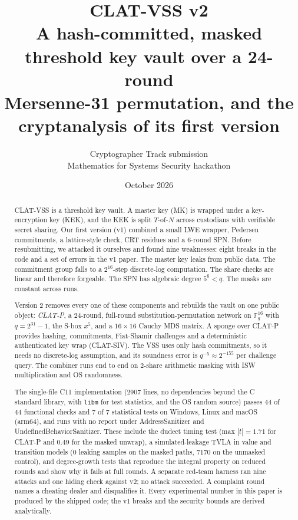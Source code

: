 \documentclass[10pt,a4paper]{article}
\title{\textbf{CLAT-VSS v2}\\[4pt]
\large A hash-committed, masked threshold key vault over a 24-round\\ Mersenne-31 permutation, and the cryptanalysis of its first version}
\author{Cryptographer Track submission\\ Mathematics for Systems Security hackathon}
\date{October 2026}
\newcommand{\Fq}{\mathbb{F}_q}
\newcommand{\code}[1]{\texttt{#1}}
\newcommand{\abs}[1]{\left\lvert #1 \right\rvert}
\theoremstyle{definition}
\theoremstyle{remark}
\begin{document}
\maketitle

\begin{abstract}
CLAT-VSS is a threshold key vault. A master key (MK) is wrapped under a key-encryption key (KEK), and the KEK is split $T$-of-$N$ across custodians with verifiable secret sharing. Our first version (v1) combined a small LWE wrapper, Pedersen commitments, a lattice-style check, CRT residues and a 6-round SPN. Before resubmitting, we attacked it ourselves and found nine weaknesses: eight breaks in the code and a set of errors in the v1 paper. The master key leaks from public data. The commitment group falls to a $2^{16}$-step discrete-log computation. The share checks are linear and therefore forgeable. The SPN has algebraic degree $5^6 < q$. The masks are constant across runs.

Version 2 removes every one of these components and rebuilds the vault on one public object: \emph{CLAT-P}, a 24-round, full-round substitution-permutation network on $\Fq^{16}$ with $q = 2^{31}-1$, the S-box $x^5$, and a $16\times16$ Cauchy MDS matrix. A sponge over CLAT-P provides hashing, commitments, Fiat-Shamir challenges and a deterministic authenticated key wrap (CLAT-SIV). The VSS uses only hash commitments, so it needs no discrete-log assumption, and its soundness error is $q^{-5} \approx 2^{-155}$ per challenge query. The combiner runs end to end on 2-share arithmetic masking with ISW multiplication and OS randomness.

The single-file C11 implementation (2907 lines, no dependencies beyond the C standard library, with \code{libm} for test statistics, and the OS random source) passes 44 of 44 functional checks and 7 of 7 statistical tests on Windows, Linux and macOS (arm64), and runs with no report under AddressSanitizer and UndefinedBehaviorSanitizer. These include the dudect timing test (max $\abs{t} = 1.71$ for CLAT-P and $0.49$ for the masked unwrap), a simulated-leakage TVLA in value and transition models (0 leaking samples on the masked paths, 7170 on the unmasked control), and degree-growth tests that reproduce the integral property on reduced rounds and show why it fails at full rounds. A separate red-team harness ran nine attacks and one hiding check against v2; no attack succeeded. A complaint round names a cheating dealer and disqualifies it. Every experimental number in this paper is produced by the shipped code; the v1 breaks and the security bounds are derived analytically.
\end{abstract}
\end{document}

